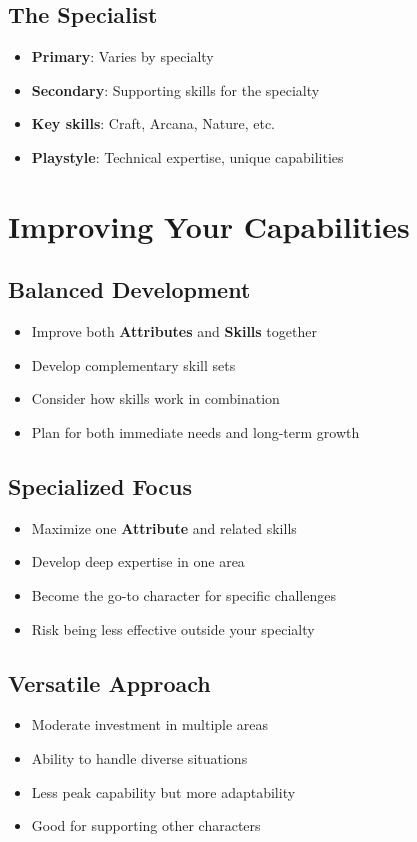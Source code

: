 \subsection*{The Specialist}
\begin{itemize}
\item \textbf{Primary}: Varies by specialty
\item \textbf{Secondary}: Supporting skills for the specialty
\item \textbf{Key skills}: Craft, Arcana, Nature, etc.
\item \textbf{Playstyle}: Technical expertise, unique capabilities
\end{itemize}

\section{Improving Your Capabilities}

\subsection*{Balanced Development}
\begin{itemize}
\item Improve both \textbf{Attributes} and \textbf{Skills} together
\item Develop complementary skill sets
\item Consider how skills work in combination
\item Plan for both immediate needs and long-term growth
\end{itemize}

\subsection*{Specialized Focus}
\begin{itemize}
\item Maximize one \textbf{Attribute} and related skills
\item Develop deep expertise in one area
\item Become the go-to character for specific challenges
\item Risk being less effective outside your specialty
\end{itemize}

\subsection*{Versatile Approach}
\begin{itemize}
\item Moderate investment in multiple areas
\item Ability to handle diverse situations
\item Less peak capability but more adaptability
\item Good for supporting other characters
\end{itemize}

